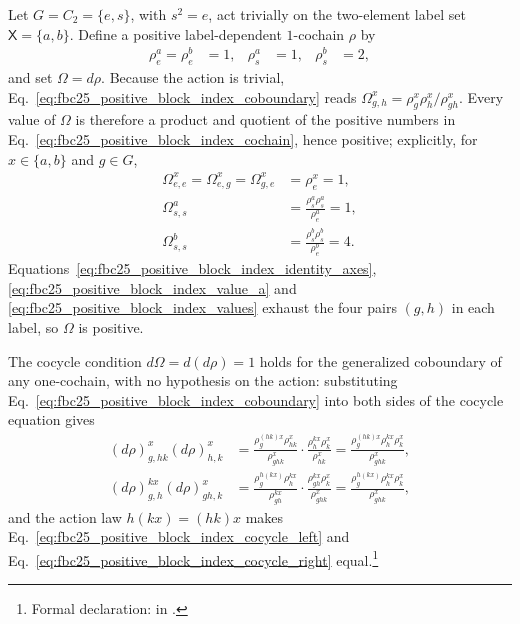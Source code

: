 \documentclass{article}
\begin{document}
Let $G=C_2=\{e,s\}$, with $s^2=e$, act trivially on the two-element label set
$\mathsf X=\{a,b\}$. Define a positive label-dependent $1$-cochain $\rho$ by
\begin{align}
    \rho^a_e=\rho^b_e&=1,
    &\rho^a_s&=1,
    &\rho^b_s&=2,
    \label{eq:fbc25_positive_block_index_cochain}
\end{align}
and set $\Omega=d\rho$. Because the action is trivial,
Eq.~\ref{eq:fbc25_positive_block_index_coboundary} reads
$\Omega^x_{g,h}=\rho^x_g\rho^x_h/\rho^x_{gh}$. Every value of $\Omega$ is
therefore a product and quotient of the positive numbers in
Eq.~\ref{eq:fbc25_positive_block_index_cochain}, hence positive; explicitly,
for $x\in\{a,b\}$ and $g\in G$,
\begin{align}
    \Omega^x_{e,e}=\Omega^x_{e,g}=\Omega^x_{g,e}
        &=\rho^x_e=1,
    \label{eq:fbc25_positive_block_index_identity_axes}\\
    \Omega^a_{s,s}
        &=\frac{\rho^a_s\rho^a_s}{\rho^a_e}=1,
    \label{eq:fbc25_positive_block_index_value_a}\\
    \Omega^b_{s,s}
        &=\frac{\rho^b_s\rho^b_s}{\rho^b_e}=4.
    \label{eq:fbc25_positive_block_index_values}
\end{align}
Equations~\ref{eq:fbc25_positive_block_index_identity_axes},
\ref{eq:fbc25_positive_block_index_value_a} and
\ref{eq:fbc25_positive_block_index_values} exhaust the four pairs $(g,h)$ in
each label, so $\Omega$ is positive.

The cocycle condition $d\Omega=d(d\rho)=1$ holds for the generalized
coboundary of any one-cochain, with no hypothesis on the action: substituting
Eq.~\ref{eq:fbc25_positive_block_index_coboundary} into both sides of the
cocycle equation gives
\begin{align}
    (d\rho)^x_{g,hk}(d\rho)^x_{h,k}
        &=\frac{\rho^{(hk)x}_g\rho^x_{hk}}{\rho^x_{ghk}}
          \cdot\frac{\rho^{k x}_h\rho^x_k}{\rho^x_{hk}}
        =\frac{\rho^{(hk)x}_g\rho^{k x}_h\rho^x_k}{\rho^x_{ghk}},
    \label{eq:fbc25_positive_block_index_cocycle_left}\\
    (d\rho)^{k x}_{g,h}(d\rho)^x_{gh,k}
        &=\frac{\rho^{h(k x)}_g\rho^{k x}_h}{\rho^{k x}_{gh}}
          \cdot\frac{\rho^{k x}_{gh}\rho^x_k}{\rho^x_{ghk}}
        =\frac{\rho^{h(k x)}_g\rho^{k x}_h\rho^x_k}{\rho^x_{ghk}},
    \label{eq:fbc25_positive_block_index_cocycle_right}
\end{align}
and the action law $h(k x)=(hk)x$ makes
Eq.~\ref{eq:fbc25_positive_block_index_cocycle_left} and
Eq.~\ref{eq:fbc25_positive_block_index_cocycle_right} equal.\footnote{Formal
declaration:
 in
.}
\end{document}
